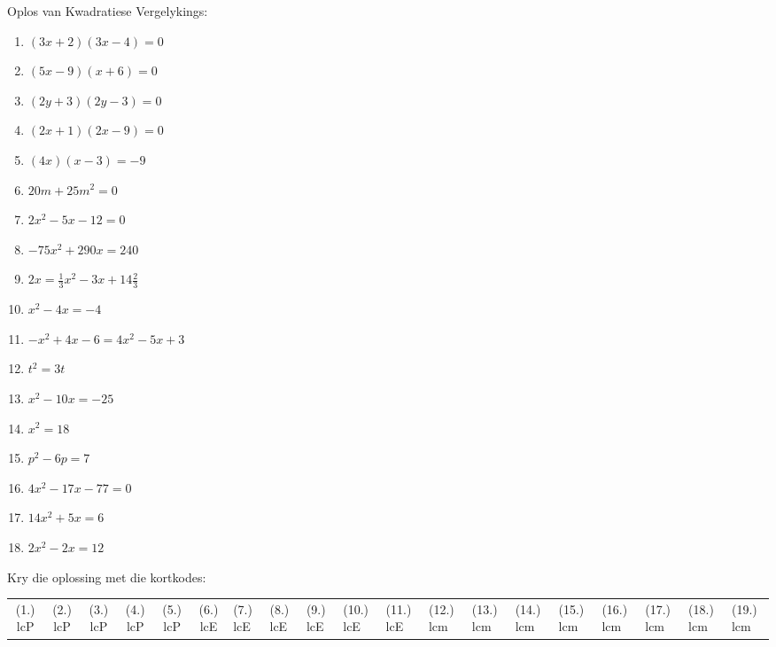 \begin{exercises}{ }
{
Oplos van Kwadratiese Vergelykings:
\begin{multicols}{2}
\begin{enumerate}[noitemsep, label=\textbf{\arabic*}. ] 
\item  $(3x+2)(3x-4)=0$
\item  $(5x-9)(x+6)=0$
\item  $(2y+3)(2y-3)=0$ 
\item  $(2x+1)(2x-9)=0$    
\item  $(4x)(x-3)=-9$       
\item  $20m+25{m}^{2}=0$
\item  $2{x}^{2}-5x-12=0$  
\item  $-75{x}^{2}+290x=240$
\item  $2x=\frac{1}{3}{x}^{2}-3x+14\frac{2}{3}$
\item  ${x}^{2}-4x=-4$      
\item  $-{x}^{2}+4x-6=4{x}^{2}-5x+3$       
\item  ${t}^{2}=3t$  
\item  ${x}^{2}-10x=-25$      
\item  ${x}^{2}=18$
\item  ${p}^{2}-6p=7$
\item  $4{x}^{2}-17x-77=0$
\item  $14{x}^{2}+5x=6$
\item  $2{x}^{2}-2x=12$              
\end{enumerate}
\end{multicols}
\par {} Kry die oplossing met die kortkodes:
\par\begin{tabular}[h]{cccccc}
(1.) lcP  &  (2.) lcP  &  (3.) lcP  &  (4.) lcP  &  (5.) lcP  &  (6.) lcE  &  (7.) lcE  &  (8.) lcE  &  (9.) lcE  &  (10.) lcE  &  (11.) lcE  &  (12.) lcm  &  (13.) lcm  &  (14.) lcm  &  (15.) lcm  &  (16.) lcm  &  (17.) lcm  &  (18.) lcm  &  (19.) lcm  & \end{tabular}
}
\end{exercises}
